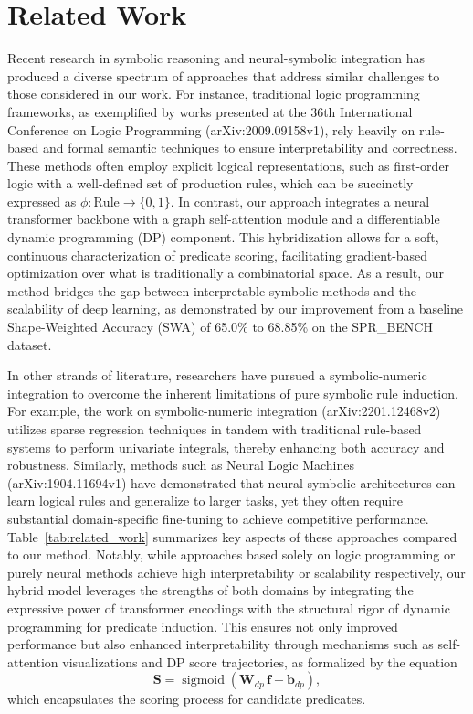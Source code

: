 \documentclass{article}
\begin{document}
\section{Related Work}
Recent research in symbolic reasoning and neural-symbolic integration has produced a diverse spectrum of approaches that address similar challenges to those considered in our work. For instance, traditional logic programming frameworks, as exemplified by works presented at the 36th International Conference on Logic Programming (arXiv:2009.09158v1), rely heavily on rule-based and formal semantic techniques to ensure interpretability and correctness. These methods often employ explicit logical representations, such as first-order logic with a well-defined set of production rules, which can be succinctly expressed as \(\phi: \text{Rule} \to \{0,1\}\). In contrast, our approach integrates a neural transformer backbone with a graph self-attention module and a differentiable dynamic programming (DP) component. This hybridization allows for a soft, continuous characterization of predicate scoring, facilitating gradient-based optimization over what is traditionally a combinatorial space. As a result, our method bridges the gap between interpretable symbolic methods and the scalability of deep learning, as demonstrated by our improvement from a baseline Shape-Weighted Accuracy (SWA) of 65.0\% to 68.85\% on the SPR\_BENCH dataset.

In other strands of literature, researchers have pursued a symbolic-numeric integration to overcome the inherent limitations of pure symbolic rule induction. For example, the work on symbolic-numeric integration (arXiv:2201.12468v2) utilizes sparse regression techniques in tandem with traditional rule-based systems to perform univariate integrals, thereby enhancing both accuracy and robustness. Similarly, methods such as Neural Logic Machines (arXiv:1904.11694v1) have demonstrated that neural-symbolic architectures can learn logical rules and generalize to larger tasks, yet they often require substantial domain-specific fine-tuning to achieve competitive performance. Table~\ref{tab:related_work} summarizes key aspects of these approaches compared to our method. Notably, while approaches based solely on logic programming or purely neural methods achieve high interpretability or scalability respectively, our hybrid model leverages the strengths of both domains by integrating the expressive power of transformer encodings with the structural rigor of dynamic programming for predicate induction. This ensures not only improved performance but also enhanced interpretability through mechanisms such as self-attention visualizations and DP score trajectories, as formalized by the equation
\[
\mathbf{S} = \operatorname{sigmoid}\left(\mathbf{W}_{dp}\, \mathbf{f} + \mathbf{b}_{dp}\right),
\]
which encapsulates the scoring process for candidate predicates.
\end{document}
